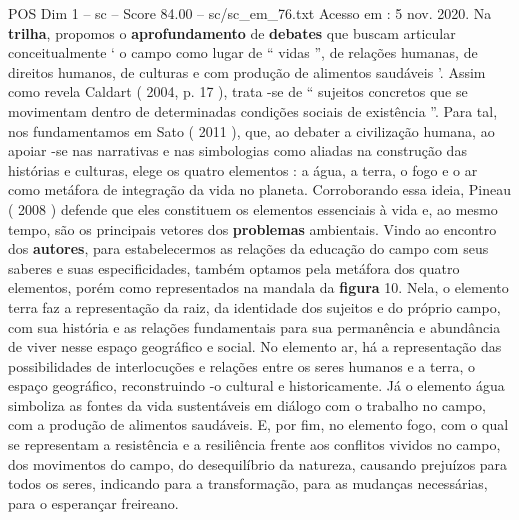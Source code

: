 \begin{textsample}{POS Dim 1 – sc – Score 84.00 – sc/sc\_em\_76.txt}
Acesso em : 5 nov. 2020.
Na \textbf{trilha}, propomos o \textbf{aprofundamento} de \textbf{debates} que buscam articular conceitualmente ‘ o campo como lugar de “ vidas ”, de relações humanas, de direitos humanos, de culturas e com produção de alimentos saudáveis ’.
Assim como revela Caldart ( 2004, p. 17 ), trata -se de “ sujeitos concretos que se movimentam dentro de determinadas condições sociais de existência ”.
Para tal, nos fundamentamos em Sato ( 2011 ), que, ao debater a civilização humana, ao apoiar -se nas narrativas e nas simbologias como aliadas na construção das histórias e culturas, elege os quatro elementos : a água, a terra, o fogo e o ar como metáfora de integração da vida no planeta.
Corroborando essa ideia, Pineau ( 2008 ) defende que eles constituem os elementos essenciais à vida e, ao mesmo tempo, são os principais vetores dos \textbf{problemas} ambientais.
Vindo ao encontro dos \textbf{autores}, para estabelecermos as relações da educação do campo com seus saberes e suas especificidades, também optamos pela metáfora dos quatro elementos, porém como representados na mandala da \textbf{figura} 10.
Nela, o elemento terra faz a representação da raiz, da identidade dos sujeitos e do próprio campo, com sua história e as relações fundamentais para sua permanência e abundância de viver nesse espaço geográfico e social.
No elemento ar, há a representação das possibilidades de interlocuções e relações entre os seres humanos e a terra, o espaço geográfico, reconstruindo -o cultural e historicamente.
Já o elemento água simboliza as fontes da vida sustentáveis em diálogo com o trabalho no campo, com a produção de alimentos saudáveis.
E, por fim, no elemento fogo, com o qual se representam a resistência e a resiliência frente aos conflitos vividos no campo, dos movimentos do campo, do desequilíbrio da natureza, causando prejuízos para todos os seres, indicando para a transformação, para as mudanças necessárias, para o esperançar freireano.

\end{textsample}
